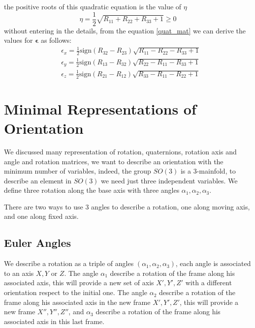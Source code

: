\documentclass[10pt, letterpaper]{report}
\begin{document}
the positive roots of this quadratic equation is the value of $\eta$\begin{equation}
    \eta=\frac{1}{2}\sqrt{R_{11}+R_{22}+R_{33}+1}\ge 0 
\end{equation}
without entering in the details, from the equation \eqref{quat_mat} we can derive the values for $\boldsymbol{\epsilon}$ as follows:\begin{align}
    &\epsilon_x=\frac{1}{2}\text{sign}(R_{32}-R_{23})\sqrt{R_{11}-R_{22}-R_{33}+1}\\
    &\epsilon_y=\frac{1}{2}\text{sign}(R_{13}-R_{32})\sqrt{R_{22}-R_{11}-R_{33}+1}\\
    &\epsilon_z=\frac{1}{2}\text{sign}(R_{21}-R_{12})\sqrt{R_{33}-R_{11}-R_{22}+1}
\end{align}
\section{Minimal Representations of Orientation}
We discussed many representation of rotation, quaternions, rotation axis and angle and  rotation matrices, we want to describe an orientation with the minimum number of variables, indeed, the group $SO(3)$ is a 3-mainfold, to describe an element in $SO(3)$ we need just three independent variables. We define three rotation along the base axis with three angles $\alpha_1,\alpha_2,\alpha_3$.\bigskip 

There are two ways to use 3 angles to describe a rotation, one along moving axis, and one along fixed axis.
\subsection{Euler Angles}
We describe a rotation as a triple of angles $(\alpha_1,\alpha_2,\alpha_3)$, each angle is associated to an axis $X,Y$ or $Z$. The angle $\alpha_1$ describe a rotation of the frame along his associated axis, this will provide a new set of axis $X',Y',Z'$ with a different orientation respect to the initial one. The angle $\alpha_2$ describe a rotation of the frame along his associated axis in the new frame $X',Y',Z'$, this will provide a new frame $X'',Y'',Z''$, and  $\alpha_3$ describe a rotation of the frame along his associated axis in this last frame.\bigskip 
\end{document}
